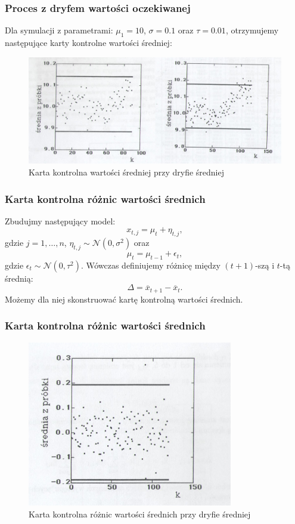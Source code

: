 \documentclass[11pt,usenames,dvipsnames,svgnames,x11names]{beamer}
\theoremstyle{plain}
\theoremstyle{definition}
\theoremstyle{remark}
\begin{document}
\begin{frame} 
\frametitle{Proces z dryfem wartości oczekiwanej}

Dla symulacji z parametrami: $\mu_1=10$, $\sigma=0.1$ oraz $\tau=0.01$, otrzymujemy następujące karty kontrolne wartości średniej:

\begin{center}
	\begin{figure}[htbp]
			\includegraphics[width=\textwidth]{obr1.png}
			\caption{Karta kontrolna wartości średniej przy dryfie średniej}
	\end{figure}
\end{center}

\end{frame}

\begin{frame} 
\frametitle{Karta kontrolna różnic wartości średnich}

Zbudujmy następujący model:
$$x_{t,j}=\mu_t+\eta_{t,j},$$
gdzie $j=1,\dots,n$, $\eta_{t,j}\sim\mathcal{N}(0,\sigma^2)$ oraz 
$$\mu_t=\mu_{t-1}+\epsilon_t,$$gdzie $\epsilon_t\sim\mathcal{N}(0,\tau^2)$.
Wówczas definiujemy różnicę między $(t+1)$-szą i $t$-tą średnią:
$$\Delta=\overline{x}_{t+1}-\overline{x}_{t}.$$
Możemy dla niej skonstruować kartę kontrolną wartości średnich. 
\end{frame}

\begin{frame}
\frametitle{Karta kontrolna różnic wartości średnich}
\begin{center}
	\begin{figure}[htbp]
			\includegraphics[width=0.8\textwidth]{obr2.png}
			\caption{Karta kontrolna różnic wartości średnich przy dryfie średniej}
	\end{figure}
\end{center}
\end{frame}
\end{document}
